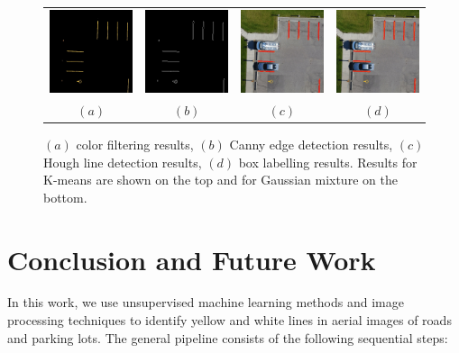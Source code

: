 \documentclass{m2pi}
\begin{document}
\begin{figure}[htp]
\begin{tabular}{cccc}
\includegraphics[width=3.5cm]{figures/Masked_Lot1G.jpg}&
\includegraphics[width=3.5cm]{figures/Edge_Lot1G.jpg}&
\includegraphics[width=3.5cm]{figures/Detected_Lot1G.jpg}&
\includegraphics[width=3.5cm]{figures/Boxed_line_Lot1G.jpg}\\
$(a)$ & $(b)$ & $(c)$ & $(d)$
\end{tabular}
\caption{$(a)$ color filtering results, $(b)$ Canny edge detection results,
$(c)$ Hough line detection results, $(d)$ box labelling results. 
Results for K-means are shown on the top and for Gaussian mixture on the
bottom.}
\label{lot1result}
\end{figure}



\section{Conclusion and Future Work}

In this work, we use unsupervised machine learning methods and image processing techniques to identify yellow and white lines in aerial images of roads and parking lots. The general pipeline consists of the following sequential steps:
\end{document}
